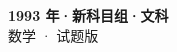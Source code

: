 \documentclass[zihao=-4, a4paper]{ctexart}
\begin{document}
\begin{center}
  {\Large\bfseries 1993 年·新科目组·文科}\\[4pt]
  {\large 数学 · 试题版}
\end{center}
\medskip
{}

\end{document}
